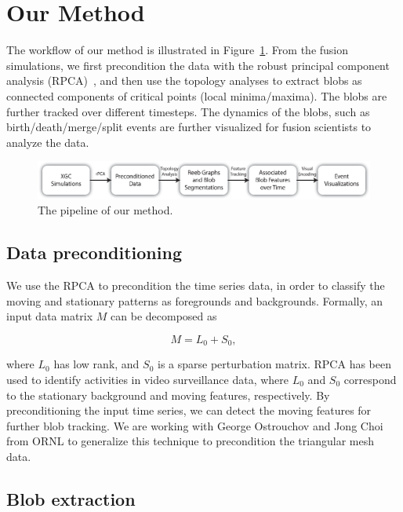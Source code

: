 \section{Our Method}
\label{sec:method}

The workflow of our method is illustrated in Figure~\ref{fig:pipeline}.  
From the fusion simulations, we first precondition the data with the robust principal component analysis (RPCA)~\cite{CandesLMW11}, and then use the topology analyses to extract blobs as connected components of critical points (local minima/maxima).  The blobs are further tracked over different timesteps.  The dynamics of the blobs, such as birth/death/merge/split events are further visualized for fusion scientists to analyze the data.  



\begin{figure}
  \centering
  \includegraphics[width=\linewidth]{Figs/pipeline}
  \caption{The pipeline of our method.}
  \label{fig:pipeline}
\end{figure}


\subsection{Data preconditioning}

We use the RPCA to precondition the time series data, in order to classify the moving and stationary patterns as foregrounds and backgrounds.  Formally, an input data matrix $M$ can be decomposed as 

\begin{equation}
M = L_0 + S_0, 
\end{equation}

\noindent where $L_0$ has low rank, and $S_0$ is a sparse perturbation matrix.  RPCA has been used to identify activities in video surveillance data, where $L_0$ and $S_0$ correspond to the stationary background and moving features, respectively.  By preconditioning the input time series, we can detect the moving features for further blob tracking.  We are working with George Ostrouchov and Jong Choi from ORNL to generalize this technique to precondition the triangular mesh data.  


\subsection{Blob extraction}

